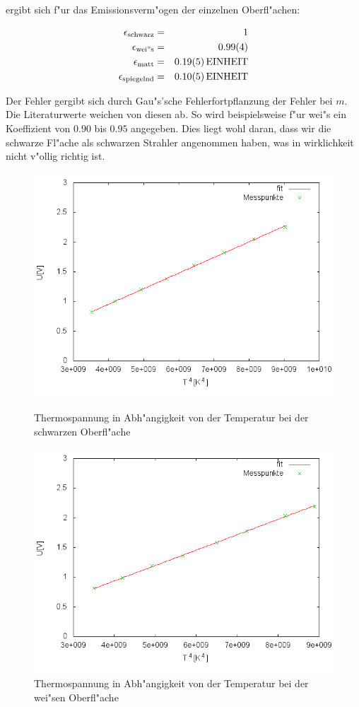 	ergibt sich f"ur das Emissionsverm"ogen der einzelnen Oberfl"achen:

	\begin{eqnarray*}
		\epsilon_\mathrm{schwarz} &=& \SI{1}{}\\
		\epsilon_\mathrm{wei"s} &=& \SI{0.99 (4)}{}\\
		\epsilon_\mathrm{matt} &=& \SI{0.19 (5)}{EINHEIT}\\
		\epsilon_\mathrm{spiegelnd} &=& \SI{0.10 (5)}{EINHEIT}
	\end{eqnarray*}

	Der Fehler gergibt sich durch Gau"s'sche Fehlerfortpflanzung der Fehler bei $m$.
	Die Literaturwerte \cite{emission} weichen von diesen ab.
	So wird beispielsweise f"ur wei"s ein Ko\-ef\-fi\-zient von $0.90$ bis $0.95$ angegeben.
	Dies liegt wohl daran, dass wir die schwarze Fl"ache als schwarzen Strahler angenommen haben, was in wirklichkeit nicht v"ollig richtig ist.

	\begin{figure}[htbp]
		\centering
		\includegraphics[width = 12cm]{img/schwarz.png}
		\caption{Thermospannung in Abh"angigkeit von der Temperatur bei der schwarzen Oberfl"ache}
		\label{schwarz_graph}

		\centering
		\includegraphics[width = 12cm]{img/weiss.png}
		\caption{Thermospannung in Abh"angigkeit von der Temperatur bei der wei"sen Oberfl"ache}
		\label{weis_graph}
	\end{figure}

